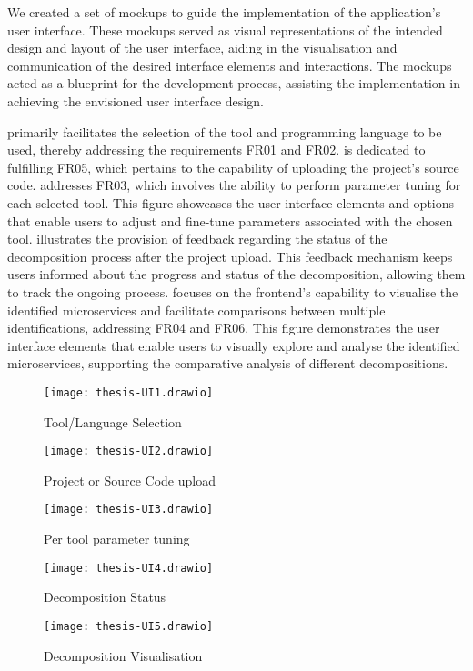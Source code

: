 We created a set of mockups to guide the implementation of the application's
user interface. These mockups served as visual representations of the intended
design and layout of the user interface, aiding in the visualisation and
communication of the desired interface elements and interactions. The mockups
acted as a blueprint for the development process, assisting the implementation
in achieving the envisioned user interface design.

 primarily facilitates the selection
of the tool and programming language to be used, thereby addressing the
requirements FR01 and FR02.  is
dedicated to fulfilling FR05, which pertains to the capability of uploading the
project's source code.  addresses FR03,
which involves the ability to perform parameter tuning for each selected tool.
This figure showcases the user interface elements and options that enable users
to adjust and fine-tune parameters associated with the chosen tool.
 illustrates the provision of feedback
regarding the status of the decomposition process after the project upload.
This feedback mechanism keeps users informed about the progress and status of
the decomposition, allowing them to track the ongoing process.
 focuses on the frontend's
capability to visualise the identified microservices and facilitate comparisons
between multiple identifications, addressing FR04 and FR06. This figure
demonstrates the user interface elements that enable users to visually explore
and analyse the identified microservices, supporting the comparative analysis
of different decompositions.

\begin{figure*}[!htb]
  \centering
  \texttt{[image: thesis-UI1.drawio]}
  \caption{Tool/Language Selection}
  \label{fig:mockup-tool-language-selection}
\end{figure*}

\begin{figure*}[!htb]
  \centering
  \texttt{[image: thesis-UI2.drawio]}
  \caption{Project or Source Code upload}
  \label{fig:mockup-project-source-code-upload}
\end{figure*}

\begin{figure*}[!htb]
  \centering
  \texttt{[image: thesis-UI3.drawio]}
  \caption{Per tool parameter tuning}
  \label{fig:mockup-tool-parameter-tuning}
\end{figure*}

\begin{figure*}[!htb]
  \centering
  \texttt{[image: thesis-UI4.drawio]}
  \caption{Decomposition Status}
  \label{fig:mockup-decomposition-status}
\end{figure*}

\begin{figure*}[!htb]
  \centering
  \texttt{[image: thesis-UI5.drawio]}
  \caption{Decomposition Visualisation}
  \label{fig:mockup-decomposition-visualisation}
\end{figure*}
